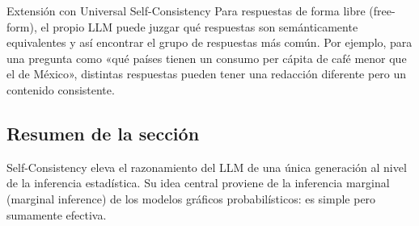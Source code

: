 \begin{knowledgebox}{Extensión con Universal Self-Consistency}
Para respuestas de forma libre (free-form), el propio LLM puede juzgar qué respuestas son semánticamente equivalentes y así encontrar el grupo de respuestas más común. Por ejemplo, para una pregunta como «qué países tienen un consumo per cápita de café menor que el de México», distintas respuestas pueden tener una redacción diferente pero un contenido consistente.
\end{knowledgebox}

\subsection{Resumen de la sección}

Self-Consistency eleva el razonamiento del LLM de una única generación al nivel de la inferencia estadística. Su idea central proviene de la inferencia marginal (marginal inference) de los modelos gráficos probabilísticos: es simple pero sumamente efectiva.

